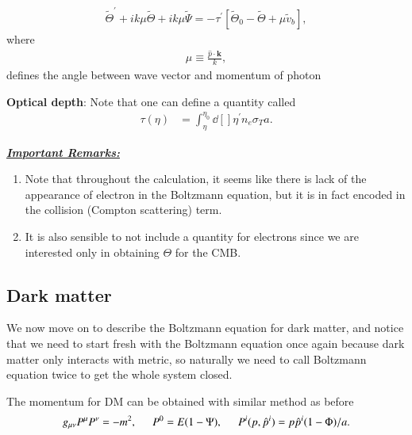 \documentclass[a4paper, 12pt]{article}
\begin{document}
{{        \begin{align}
          \label{fourier boltzmann metric photon electron}
          \tilde{\Theta}^{\prime} + i k \mu \tilde{\Theta} + i k \mu
          \tilde{\Psi} = - \tau^{\prime} [\tilde{\Theta}_{0} -
          \tilde{\Theta} + \mu \tilde{v}_{b}], 
        \end{align} where 
        \begin{align}
          \label{definition of mu}
          \mu \equiv \frac{\hat{p} \cdot \textbf{k}}{k},
        \end{align} defines the angle between wave vector and
        momentum of photon

      \textbf{Optical depth}: Note that one can define a quantity
      called 
      \begin{align}
        \label{optical depth}
        \tau (\eta) &= \int_{\eta}^{\eta_0} \dd[]{\eta^{\prime}}
        n_{e} \sigma_{T} a.
      \end{align}

  \underline{\textbf{\textit{Important Remarks:}}}
  \begin{enumerate}
    \item[\circ] Note that throughout the calculation, it seems like
    there is lack of the appearance of electron in the Boltzmann equation,
    but it is in fact encoded in the collision (Compton
    scattering) term.
    \item[\circ] It is also sensible to not include a quantity for
    electrons since we are interested only in obtaining \( \Theta \)
    for the CMB.
  \end{enumerate}

  \subsection{Dark matter}%
      \label{sub:Dark matter}
   
   We now move on to describe the Boltzmann equation for dark matter,
   and notice that we need to start fresh with the Boltzmann equation
   once again because dark matter only interacts with metric, so naturally
   we need to call Boltzmann equation twice to get the whole system
   closed. 
   
   The momentum for DM can be obtained with similar method as before 
   \begin{align}
    \label{DM momentum }
     g_{\mu \nu} P^{\mu} P^{\nu} = -m^2, \hspace{0.5cm} P^{0} = E (1 -
     \Psi), \hspace{0.5cm} P^{i}(p, \hat{p}^{i} ) = p
     \hat{p}^{i}(1 - \Phi)/a.  
   \end{align}

}}
\end{document}
